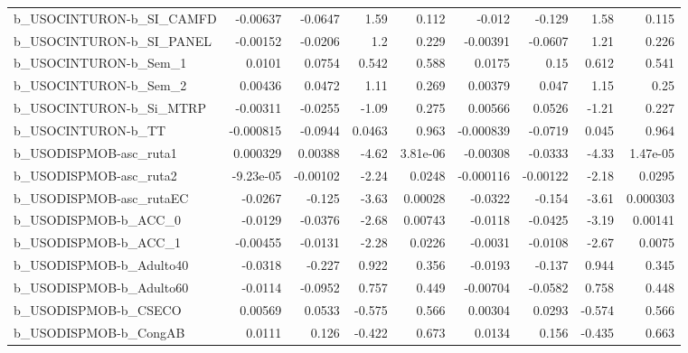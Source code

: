 \begin{tabular}{lrrrrrrrr}
b\_USOCINTURON-b\_SI\_CAMFD   &    -0.00637 &      -0.0647 &     1.59 &    0.112 &     -0.012 &      -0.129 &         1.58 &         0.115 \\
b\_USOCINTURON-b\_SI\_PANEL   &    -0.00152 &      -0.0206 &      1.2 &    0.229 &   -0.00391 &     -0.0607 &         1.21 &         0.226 \\
b\_USOCINTURON-b\_Sem\_1      &      0.0101 &       0.0754 &    0.542 &    0.588 &     0.0175 &        0.15 &        0.612 &         0.541 \\
b\_USOCINTURON-b\_Sem\_2      &     0.00436 &       0.0472 &     1.11 &    0.269 &    0.00379 &       0.047 &         1.15 &          0.25 \\
b\_USOCINTURON-b\_Si\_MTRP    &    -0.00311 &      -0.0255 &    -1.09 &    0.275 &    0.00566 &      0.0526 &        -1.21 &         0.227 \\
b\_USOCINTURON-b\_TT         &   -0.000815 &      -0.0944 &   0.0463 &    0.963 &  -0.000839 &     -0.0719 &        0.045 &         0.964 \\
b\_USODISPMOB-asc\_ruta1     &    0.000329 &      0.00388 &    -4.62 & 3.81e-06 &   -0.00308 &     -0.0333 &        -4.33 &      1.47e-05 \\
b\_USODISPMOB-asc\_ruta2     &   -9.23e-05 &     -0.00102 &    -2.24 &   0.0248 &  -0.000116 &    -0.00122 &        -2.18 &        0.0295 \\
b\_USODISPMOB-asc\_rutaEC    &     -0.0267 &       -0.125 &    -3.63 &  0.00028 &    -0.0322 &      -0.154 &        -3.61 &      0.000303 \\
b\_USODISPMOB-b\_ACC\_0       &     -0.0129 &      -0.0376 &    -2.68 &  0.00743 &    -0.0118 &     -0.0425 &        -3.19 &       0.00141 \\
b\_USODISPMOB-b\_ACC\_1       &    -0.00455 &      -0.0131 &    -2.28 &   0.0226 &    -0.0031 &     -0.0108 &        -2.67 &        0.0075 \\
b\_USODISPMOB-b\_Adulto40    &     -0.0318 &       -0.227 &    0.922 &    0.356 &    -0.0193 &      -0.137 &        0.944 &         0.345 \\
b\_USODISPMOB-b\_Adulto60    &     -0.0114 &      -0.0952 &    0.757 &    0.449 &   -0.00704 &     -0.0582 &        0.758 &         0.448 \\
b\_USODISPMOB-b\_CSECO       &     0.00569 &       0.0533 &   -0.575 &    0.566 &    0.00304 &      0.0293 &       -0.574 &         0.566 \\
b\_USODISPMOB-b\_CongAB      &      0.0111 &        0.126 &   -0.422 &    0.673 &     0.0134 &       0.156 &       -0.435 &         0.663 \\

\end{tabular}
